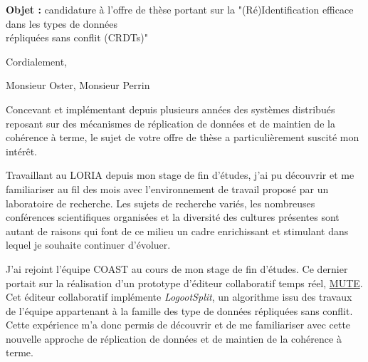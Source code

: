 \documentclass[11pt,a4paper,sans]{moderncv}        %
\newcommand{\customboldlink}[1]{\color{href} #1}
\newcommand{\tab}{\quad \quad}
\begin{document}
\date{À Nancy, le 25 mai 2017}
\opening{
  \textbf{Objet :} candidature à l'offre de thèse portant sur la "(Ré)Identification efficace dans les types de données\\
  \hspace{13mm}    répliquées sans conflit (CRDTs)"
}
\closing{Cordialement,}
\makelettertitle

Monsieur Oster, Monsieur Perrin

\justify

\tab Concevant et implémentant depuis plusieurs années des systèmes distribués
reposant sur des mécanismes de réplication de données et de maintien de la cohérence à terme,
le sujet de votre offre de thèse a particulièrement suscité mon intérêt.

%
%
\tab Travaillant au LORIA depuis mon stage de fin d'études,
j'ai pu découvrir et me familiariser au fil des mois avec l'environnement de travail proposé par un laboratoire de recherche.
Les sujets de recherche variés, les nombreuses conférences scientifiques organisées
et la diversité des cultures présentes sont autant de raisons
qui font de ce milieu un cadre enrichissant et stimulant dans lequel je souhaite continuer d'évoluer.

%
%
\tab J'ai rejoint l'équipe COAST au cours de mon stage de fin d'études.
Ce dernier portait sur la réalisation d'un prototype d'éditeur collaboratif temps réel,
\href{https://www.coedit.re}{\customboldlink MUTE}.
Cet éditeur collaboratif implémente \emph{LogootSplit},
un algorithme issu des travaux de l'équipe appartenant à la famille des type de données répliquées sans conflit.
Cette expérience m'a donc permis de découvrir
et de me familiariser avec cette nouvelle approche
de réplication de données et de maintien de la cohérence à terme.
\end{document}
